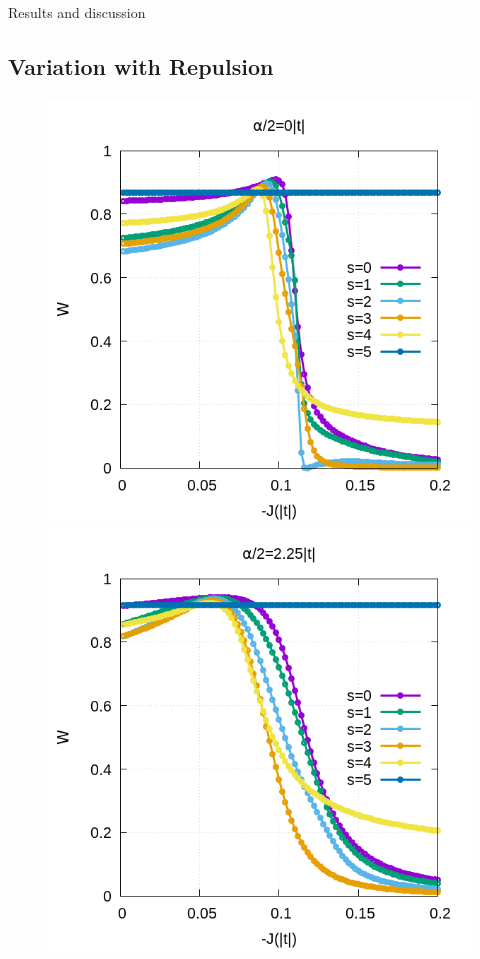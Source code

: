 \documentclass[12pt,twoside]{report}
\begin{document}
\begin{chapter}{Results and discussion}
	\subsection{Variation with Repulsion}

	\begin{figure}[h!]
		\centering
		\hspace{-2cm}
		\begin{minipage}{0.4\textwidth}
			\includegraphics[scale=0.3]{W_vs_J_sites_2-xrep-01.png}
		\end{minipage}
		\hspace{2cm}
		\begin{minipage}{0.4\textwidth}
			\includegraphics[scale=0.3]{W_vs_J_sites_2-xrep-225.png}

\end{minipage}
\end{figure}
\end{chapter}
\end{document}
